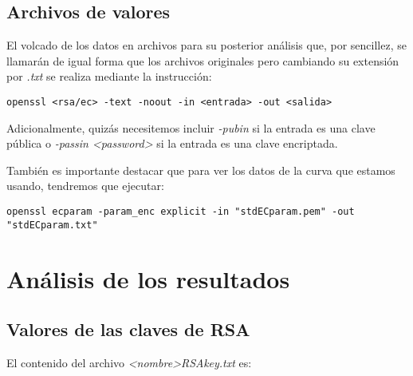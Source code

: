 \documentclass[a4paper, 11pt]{article}
\begin{document}
	\subsection{Archivos de valores}
		El volcado de los datos en archivos para su posterior análisis que, por sencillez, se llamarán de igual forma que los
		archivos originales pero cambiando su extensión por \textit{.txt} se realiza mediante la instrucción: \\
		\begin{small}
			\verb|openssl <rsa/ec> -text -noout -in <entrada> -out <salida>|
		\end{small}

		Adicionalmente, quizás necesitemos incluir \textit{-pubin} si la entrada es una clave pública o
		\textit{-passin <password>} si la entrada es una clave encriptada.
		
		También es importante destacar que para ver los datos de la curva que estamos usando, tendremos
		que ejecutar: \\
		\begin{small}
			\verb|openssl ecparam -param_enc explicit -in "stdECparam.pem" -out "stdECparam.txt"|
		\end{small}

\section{Análisis de los resultados}
	\subsection{Valores de las claves de RSA}
		El contenido del archivo \textit{<nombre>RSAkey.txt} es:
		
		
\end{document}
